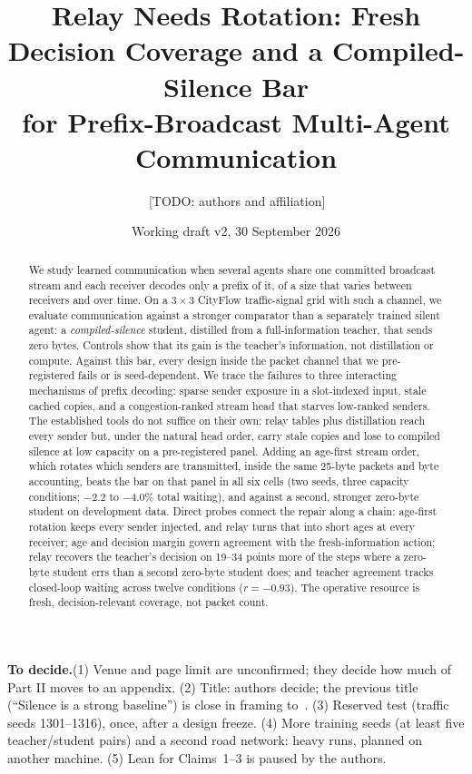 \documentclass[11pt]{article}
\theoremstyle{definition}
\newif\ifshownotes\shownotestrue
\newcommand{\TODO}[1]{\ifshownotes{\color{todocol}\,\textsf{\footnotesize[TODO: #1]}}\fi}
\newcommand{\TODOPAR}[1]{\ifshownotes\par\vspace{2pt}\noindent%
  {\color{todocol}\textsf{\footnotesize\textbf{To decide.}\;#1}}\par\vspace{2pt}\fi}
\begin{document}
\sloppy
\title{Relay Needs Rotation: Fresh Decision Coverage and a Compiled-Silence Bar\\
for Prefix-Broadcast Multi-Agent Communication}
\author{\TODO{authors and affiliation}}
\date{Working draft v2, 30 September 2026}
\maketitle

\TODOPAR{(1) Venue and page limit are unconfirmed; they decide how much of Part II moves to an appendix.
(2) Title: authors decide; the previous title (``Silence is a strong baseline'') is close in framing to~\cite{chauhan2026}.
(3) Reserved test (traffic seeds 1301--1316), once, after a design freeze. (4) More training seeds (at least five
teacher/student pairs) and a second road network: heavy runs, planned on another machine. (5) Lean for Claims~1--3 is
paused by the authors.}

\begin{abstract}
We study learned communication when several agents share one committed broadcast stream and each receiver decodes only
a prefix of it, of a size that varies between receivers and over time. On a $3\times3$ CityFlow traffic-signal grid
with such a channel, we evaluate communication against a stronger comparator than a separately trained silent agent: a
\emph{compiled-silence} student, distilled from a full-information teacher, that sends zero bytes. Controls show that
its gain is the teacher's information, not distillation or compute. Against this bar, every design inside the packet
channel that we pre-registered fails or is seed-dependent. We trace the failures to three interacting mechanisms of
prefix decoding: sparse sender exposure in a slot-indexed input, stale cached copies, and a congestion-ranked stream
head that starves low-ranked senders. The established tools do not suffice on their own: relay tables plus
distillation reach every sender but, under the natural head order, carry stale copies and lose to compiled silence at
low capacity on a pre-registered panel. Adding an age-first stream order, which rotates which senders are transmitted, inside the same 25-byte packets and byte accounting,
beats the bar on that panel in all six cells (two seeds, three capacity conditions; $-2.2$ to $-4.0\%$ total waiting),
and against a second, stronger zero-byte student on development data. Direct probes connect the repair along a chain:
age-first rotation keeps every sender injected, and relay turns that into short ages at every receiver; age and decision margin govern agreement with the fresh-information action; relay
recovers the teacher's decision on 19--34 points more of the steps where a zero-byte student errs than a second
zero-byte student does; and teacher agreement tracks closed-loop waiting across twelve conditions ($r=-0.93$). The
operative resource is fresh, decision-relevant coverage, not packet count.
\end{abstract}
\end{document}
